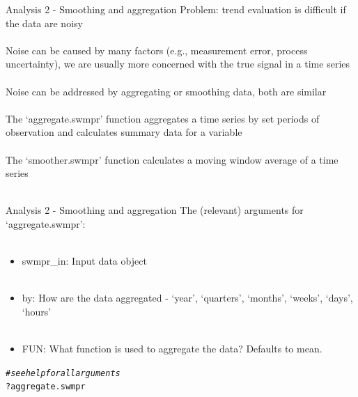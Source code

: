 \documentclass[xcolor=svgnames]{beamer}\usepackage[]{graphicx}\usepackage[]{color}
\makeatletter
\newcommand{\hlcom}[1]{\textcolor[rgb]{0.678,0.584,0.686}{\textit{#1}}}%
\newcommand{\hlopt}[1]{\textcolor[rgb]{0,0,0}{#1}}%
\newcommand{\hlstd}[1]{\textcolor[rgb]{0.345,0.345,0.345}{#1}}%
\newenvironment{kframe}{%
 \def\at@end@of@kframe{}%
 \ifinner\ifhmode%
  \def\at@end@of@kframe{\end{minipage}}%
  \begin{minipage}{\columnwidth}%
 \fi\fi%
 \def\FrameCommand##1{\hskip\@totalleftmargin \hskip-\fboxsep
 \colorbox{shadecolor}{##1}\hskip-\fboxsep
     \hskip-\linewidth \hskip-\@totalleftmargin \hskip\columnwidth}%
 \MakeFramed {\advance\hsize-\width
   \@totalleftmargin\z@ \linewidth\hsize
   \@setminipage}}%
 {\par\unskip\endMakeFramed%
 \at@end@of@kframe}
\newenvironment{knitrout}{}{} %
\makeatother
\begin{document}
\begin{frame}[containsverbatim]{Analysis 2 - Smoothing and aggregation}
\alert{Problem}: trend evaluation is difficult if the data are noisy \\~\\
Noise can be caused by many factors (e.g., measurement error, process uncertainty), we are usually more concerned with the true signal in a time series \\~\\
Noise can be addressed by aggregating or smoothing data, both are similar \\~\\
The \alert{`aggregate.swmpr'} function aggregates a time series by set periods of observation and calculates summary data for a variable \\~\\
The \alert{`smoother.swmpr'} function calculates a moving window average of a time series \\~\\
\end{frame}

\begin{frame}[containsverbatim]{Analysis 2 - Smoothing and aggregation}
The (relevant) arguments for `aggregate.swmpr':\\~\\
\begin{itemize}
\item swmpr\_in: Input data object \\~\\
\item by: How are the data aggregated - `year', `quarters', `months', `weeks', `days', `hours' \\~\\
\item FUN: What function is used to aggregate the data? Defaults to mean.
\end{itemize}
\begin{knitrout}\scriptsize
{}\color{fgcolor}\begin{kframe}
\begin{alltt}
\hlcom{# see help for all arguments}
\hlopt{?}\hlstd{aggregate.swmpr}
\end{alltt}
\end{kframe}
\end{knitrout}
\end{frame}
\end{document}
